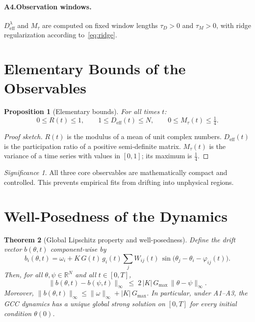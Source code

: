 \documentclass[11pt,a4paper]{article}
\theoremstyle{plain}
\newtheorem{theorem}{Theorem}[section]
\newtheorem{proposition}[theorem]{Proposition}
\theoremstyle{definition}
\theoremstyle{remark}
\newtheorem*{significance}{Significance}
\newcommand{\Deff}{D_{\mathrm{eff}}}
\newcommand{\Mtau}{M_{\tau}}
\newcommand{\Gmax}{G_{\max}}
\begin{document}
\paragraph{A4.\;Observation windows.}
$\Deff^{\lambda}$ and $\Mtau$ are computed on fixed window lengths $\tau_D > 0$ and $\tau_M > 0$, with ridge regularization according to~\eqref{eq:ridge}.


\section{Elementary Bounds of the Observables}

\begin{proposition}[Elementary bounds]
\label{prop:schranken}
For all times $t$:
\begin{equation}
0 \leq R(t) \leq 1, \qquad
1 \leq \Deff(t) \leq N, \qquad
0 \leq \Mtau(t) \leq \tfrac{1}{4}.
\end{equation}
\end{proposition}

\begin{proof}[Proof sketch]
$R(t)$ is the modulus of a mean of unit complex numbers. $\Deff(t)$ is the participation ratio of a positive semi-definite matrix. $\Mtau(t)$ is the variance of a time series with values in $[0,1]$; its maximum is $\frac{1}{4}$.
\end{proof}

\begin{significance}
All three core observables are mathematically compact and controlled. This prevents empirical fits from drifting into unphysical regions.
\end{significance}


\section{Well-Posedness of the Dynamics}

\begin{theorem}[Global Lipschitz property and well-posedness]
\label{satz:lipschitz}
Define the drift vector $b(\theta,t)$ component-wise by
\begin{equation}
b_i(\theta,t) = \omega_i + K\,G(t)\,g_i(t)\sum_j W_{ij}(t)\,\sin\!\bigl(\theta_j - \theta_i - \varphi_{ij}(t)\bigr).
\end{equation}
Then, for all $\theta,\psi \in \mathbb{R}^N$ and all $t \in [0,T]$,
\begin{equation}
\label{eq:lipschitz}
\|b(\theta,t) - b(\psi,t)\|_{\infty} \;\leq\; 2\,|K|\,\Gmax\,\|\theta - \psi\|_{\infty}.
\end{equation}
Moreover, $\|b(\theta,t)\|_{\infty} \leq \|\omega\|_{\infty} + |K|\,\Gmax$. In particular, under \textup{A1--A3}, the GCC dynamics has a unique global strong solution on $[0,T]$ for every initial condition $\theta(0)$.
\end{theorem}
\end{document}
